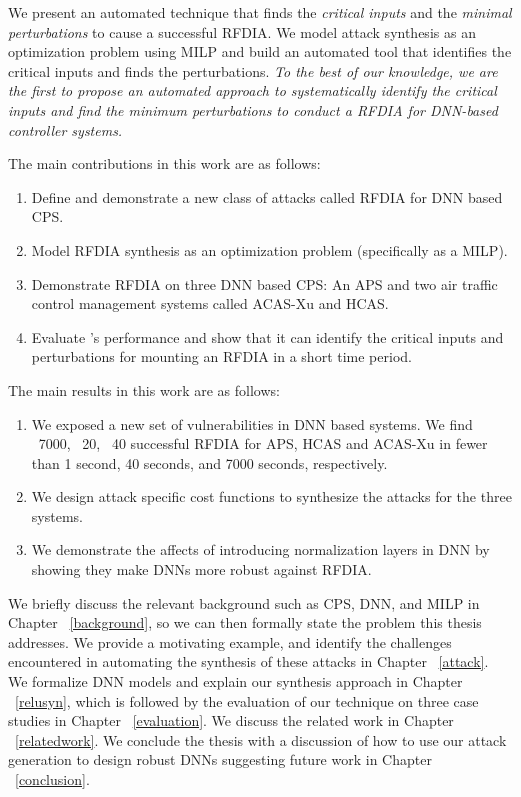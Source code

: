 We present an automated technique that finds the \textit{critical inputs} and the \textit{minimal perturbations} to cause a successful \ac{RFDIA}. 
We model attack synthesis as an optimization problem using \ac{MILP} and build an automated tool \tool that identifies the critical inputs and finds the perturbations.
{\em To the best of our knowledge, we are the first to  propose an automated approach to systematically identify the critical inputs and find the minimum perturbations to conduct a \ac{RFDIA} for DNN-based controller systems.}

The main contributions in this work are as follows:

\begin{enumerate}
	\item Define and demonstrate a new class of attacks called \ac{RFDIA} for \ac{DNN} based \ac{CPS}. 
	\item Model \ac{RFDIA} synthesis as an optimization problem (specifically as a \ac{MILP}). 
	\item Demonstrate \ac{RFDIA} on three \ac{DNN} based \ac{CPS}:  An \ac{APS} and two air traffic control management systems called \ac{ACAS-Xu} and \ac{HCAS}.
	\item Evaluate \tool's performance and show that it can identify the critical inputs and perturbations for mounting an \ac{RFDIA} in a short time period.  
\end{enumerate}

The main results in this work are as follows:

\begin{enumerate}
	\item We exposed a new set of vulnerabilities in \ac{DNN} based systems. 
	 We find ~7000, ~20, ~40 successful \ac{RFDIA} for \ac{APS}, \ac{HCAS} and \ac{ACAS-Xu} in fewer than 1 second, 40 seconds, and 7000 seconds, respectively. 
	\item We design attack specific cost functions to synthesize the attacks for the three systems.
	\item We demonstrate the affects of introducing normalization layers in \ac{DNN} by showing they make \ac{DNN}s more robust against \ac{RFDIA}. 
\end{enumerate}

	
We briefly discuss the relevant background such as \ac{CPS}, \ac{DNN}, and \ac{MILP} in Chapter ~\ref{background}, so we can then formally state the problem this thesis addresses. 
We provide a motivating example, and identify the challenges encountered in automating the synthesis of these attacks in Chapter ~\ref{attack}.
We formalize \ac{DNN} models and explain our synthesis approach in Chapter ~\ref{relusyn}, which is followed by the evaluation of our technique on three case studies in Chapter ~\ref{evaluation}.
We discuss the related work in Chapter ~\ref{relatedwork}.
We conclude the thesis with a discussion of how to use our attack generation to design robust \ac{DNN}s suggesting future work in Chapter ~\ref{conclusion}.










